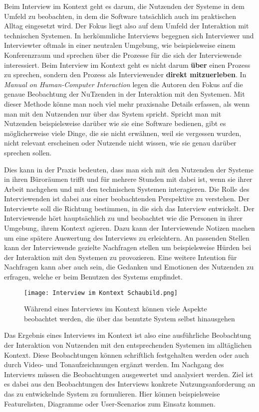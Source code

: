 Beim Interview im Kontext geht es darum, die Nutzenden der Systeme in dem
Umfeld zu beobachten, in dem die Software tatsächlich auch im praktischen
Alltag eingesetzt wird. Der Fokus liegt also auf dem Umfeld der Interaktion mit
technischen Systemen. In herkömmliche Interviews begegnen sich Interviewer und
Interviewter oftmals in einer neutralen Umgebung, wie beispielsweise einem
Konferenzraum und sprechen über die Prozesse für die sich der Interviewende
interessiert. Beim Interview im Kontext geht es nicht darum \textbf{über} einen
Prozess zu sprechen, sondern den Prozess als Interviewender \textbf{direkt
    mitzuerleben}.\cite{contextualDesign} In \textit{Manual on Human-Computer
    Interaction} legen die Autoren den Fokus auf die genaue Beobachtung der
NuTzenden in der Interaktion mit den Systemen. Mit dieser Methode könne man
noch viel mehr praxisnahe Details erfassen, als wenn man mit den Nutzenden nur
über das System spricht. Spricht man mit Nutzenden beispielsweise darüber wie
sie eine Software bedienen, gibt es möglicherweise viele Dinge, die sie nicht
erwähnen, weil sie vergessen wurden, nicht relevant erscheinen oder Nutzende
nicht wissen, wie sie genau darüber sprechen sollen.\cite{hciHandbook}

Dies kann in der Praxis bedeuten, dass man sich mit den Nutzenden der Systeme
in ihren Büroräumen trifft und für mehrere Stunden mit dabei ist, wenn sie
ihrer Arbeit nachgehen und mit den technischen Systemen interagieren. Die Rolle
des Interviewenden ist dabei aus einer beobachtenden Perspektive zu verstehen.
Der Interviewte soll die Richtung bestimmen, in die sich das Interview
entwickelt. Der Interviewende hört hauptsächlich zu und beobachtet wie die
Personen in ihrer Umgebung, ihrem Kontext agieren.\cite{hciHandbook} Dazu kann
der Interviewende Notizen machen um eine spätere Auswertung des Interviews zu
erleichtern. An passenden Stellen kann der Interviewende gezielte Nachfragen
stellen um beispielsweise Hürden bei der Interaktion mit den Systemen zu
provozieren. Eine weitere Intention für Nachfragen kann aber auch sein, die
Gedanken und Emotionen des Nutzenden zu erfragen, welche er beim Benutzen des
Systems empfindet.

\begin{figure}[h]
    \caption{Während eines Interviews im Kontext können viele Aspekte beobachtet werden, die über das benutzte System selbst hinausgehen}
    \centering
    \texttt{[image: Interview im Kontext Schaubild.png]}
\end{figure}

Das Ergebnis eines Interviews im Kontext ist also eine ausführliche Beobachtung
der Interaktion von Nutzenden mit den entsprechenden Systemen im alltäglichen
Kontext. Diese Beobachtungen können schriftlich festgehalten werden oder auch
durch Video- und Tonaufzeichnungen ergänzt werden. Im Nachgang des Interviews
müssen die Beobachtungen ausgewertet und analysiert werden. Ziel ist es dabei
aus den Beobachtungen des Interviews konkrete Nutzungsanforderung an das zu
entwickelnde System zu formulieren. Hier können beispielsweise Featurelisten,
Diagramme oder User-Scenarios zum Einsatz kommen.\cite{HMI-HCD}

